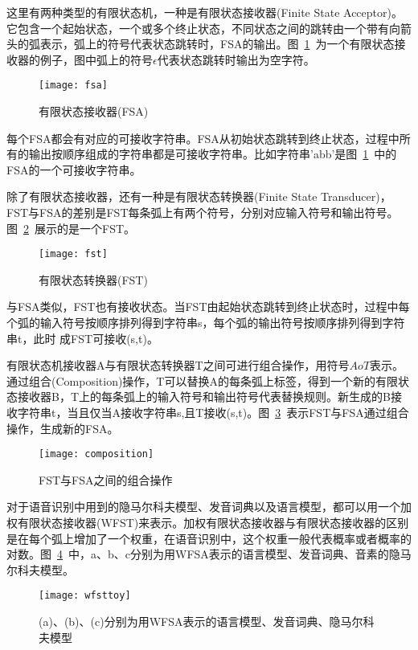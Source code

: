这里有两种类型的有限状态机，一种是有限状态接收器(Finite State Acceptor)。它包含一个起始状态，一个或多个终止状态，不同状态之间的跳转由一个带有向箭头的弧表示，弧上的符号代表状态跳转时，FSA的输出。图~\ref{fig:fsa}~为一个有限状态接收器的例子，图中弧上的符号$\epsilon$代表状态跳转时输出为空字符。
\begin{figure}[htbp]
\centering
\texttt{[image: fsa]}
\caption{有限状态接收器(FSA)}\label{fig:fsa}
\vspace{\baselineskip}
\end{figure}

每个FSA都会有对应的可接收字符串。FSA从初始状态跳转到终止状态，过程中所有的输出按顺序组成的字符串都是可接收字符串。比如字符串'abb'是图~\ref{fig:fsa}~中的FSA的一个可接收字符串。

除了有限状态接收器，还有一种是有限状态转换器(Finite State Transducer)，FST与FSA的差别是FST每条弧上有两个符号，分别对应输入符号和输出符号。图~\ref{fig:fst}~展示的是一个FST。
\begin{figure}[htbp]
\centering
\texttt{[image: fst]}
\caption{有限状态转换器(FST)}\label{fig:fst}
\vspace{\baselineskip}
\end{figure}

与FSA类似，FST也有接收状态。当FST由起始状态跳转到终止状态时，过程中每个弧的输入符号按顺序排列得到字符串s，每个弧的输出符号按顺序排列得到字符串t，此时
成FST可接收(s,t)。

有限状态机接收器A与有限状态转换器T之间可进行组合操作，用符号$AoT$表示。通过组合(Composition)操作，T可以替换A的每条弧上标签，得到一个新的有限状态接收器B，T上的每条弧上的输入符号和输出符号代表替换规则。新生成的B接收字符串t，当且仅当A接收字符串s,且T接收(s,t)。图~\ref{fig:composition}~表示FST与FSA通过组合操作，生成新的FSA。
\begin{figure}[htbp]
\centering
\texttt{[image: composition]}
\caption{FST与FSA之间的组合操作}\label{fig:composition}
\vspace{\baselineskip}
\end{figure}

对于语音识别中用到的隐马尔科夫模型、发音词典以及语言模型，都可以用一个加权有限状态接收器(WFST)来表示。加权有限状态接收器与有限状态接收器的区别是在每个弧上增加了一个权重，在语音识别中，这个权重一般代表概率或者概率的对数。图~\ref{fig:wfsttoy}~中，a、b、c分别为用WFSA表示的语言模型、发音词典、音素的隐马尔科夫模型。
\begin{figure}[htbp]
\centering
\texttt{[image: wfsttoy]}
\caption{(a)、(b)、(c)分别为用WFSA表示的语言模型、发音词典、隐马尔科夫模型\cite{mohri2002weighted}}\label{fig:wfsttoy}
\vspace{\baselineskip}
\end{figure}

